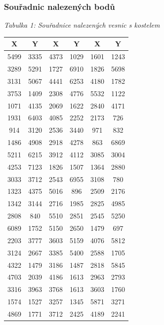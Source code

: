\subsubsection*{Souřadnic nalezených bodů}
\begin{table}[H]
    \centering
    \textit{Tabulka 1: Souřadnice nalezených vesnic s kostelem}
    
    \begin{tabular}{|c c||c c||c c|}
    \hline
    \textbf{X} & \textbf{Y} & \textbf{X} & \textbf{Y} & \textbf{X} & \textbf{Y} \\
    \hline
    5499 & 3335 & 4373 & 1029 & 1601 & 1243 \\ \hline
    3289 & 5291 & 1727 & 6910 & 1826 & 5698 \\ \hline
    3131 & 5067 & 4441 & 6253 & 4180 & 1782 \\ \hline
    3753 & 1409 & 2308 & 4776 & 5532 & 1122 \\ \hline
    1071 & 4135 & 2069 & 1622 & 2840 & 4171 \\ \hline
    1931 & 6403 & 4085 & 2252 & 2173 & 726 \\ \hline
    914 & 3120 & 2536 & 3440 & 971 & 832 \\ \hline
    1486 & 4908 & 2918 & 4278 & 863 & 6869 \\ \hline
    5211 & 6215 & 3912 & 4112 & 3085 & 3004 \\ \hline
    4253 & 7123 & 1826 & 1507 & 1364 & 2880 \\ \hline
    3033 & 3712 & 2543 & 6955 & 3108 & 780 \\ \hline
    1323 & 4375 & 5016 & 896 & 2509 & 2176 \\ \hline
    1342 & 3144 & 2716 & 1985 & 2825 & 4985 \\ \hline
    2808 & 840 & 5510 & 2851 & 2545 & 5250 \\ \hline
    6089 & 1752 & 5150 & 2650 & 1479 & 697 \\ \hline
    2203 & 3777 & 3603 & 5159 & 4076 & 5812 \\ \hline
    3124 & 2667 & 3385 & 5400 & 2588 & 1705 \\ \hline
    4322 & 1479 & 3186 & 1487 & 2818 & 5845 \\ \hline
    4703 & 2039 & 4186 & 1613 & 2963 & 2793 \\ \hline
    3316 & 3963 & 3768 & 1613 & 3603 & 1760 \\ \hline
    1574 & 1527 & 3257 & 1345 & 5871 & 3271 \\ \hline
    4869 & 1771 & 3712 & 2425 & 4189 & 2241 \\ \hline

\end{tabular}
\end{table}
